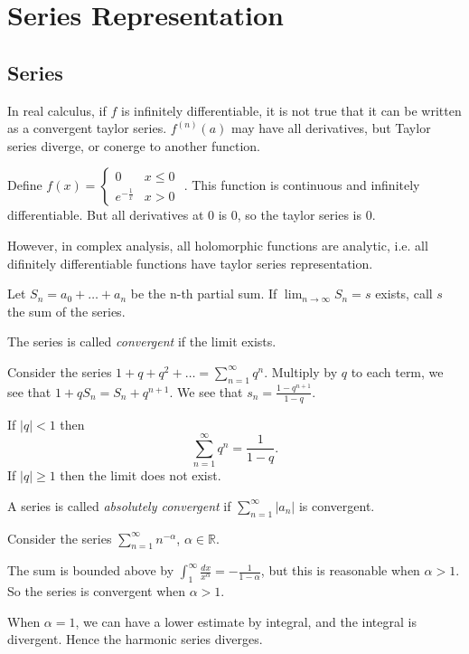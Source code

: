

\section{Series Representation}
\subsection{Series}

In real calculus, if $f$ is infinitely differentiable, it is not true that it can be written as a convergent taylor series. $f^{(n)}(a)$ may have all derivatives, but Taylor series diverge, or conerge to another function.
\begin{example}
	Define $f(x) = \begin{cases}
		0 & x\le 0\\
		e^{- \frac{1}{x}} & x>0
	\end{cases}$
	. This function is continuous and infinitely differentiable. But all derivatives at $0$ is $0$, so the taylor series is $0$.
\end{example}

However, in complex analysis, all holomorphic functions are analytic, i.e. all difinitely differentiable functions have taylor series representation.

\begin{definition}[Series]
	Let $S_n = a_0 + \ldots+ a_n$ be the n-th partial sum. If $\lim_{n \to \infty} S_n = s$ exists, call $s$ the sum of the series.

	The series is called \textit{convergent} if the limit exists.
\end{definition}

\begin{lemma}
	Consider the series $1 + q + q^2 + \ldots = \sum_{n=1}^{\infty} q^n$. Multiply by $q$ to each term, we see that $1 + qS_n = S_n + q^{n+1}$. We see that $s_n = \frac{1 - q^{n+1}}{1 - q}$.

	If $|q| < 1$ then
	\[
		\sum_{n=1}^{\infty} q^n = \frac{1}{1-q}
	.\]
	 If $|q| \ge 1$ then the limit does not exist.
\end{lemma}

\begin{definition}
	A series is called \textit{absolutely convergent} if $\sum_{n=1}^{\infty} |a_n|$ is convergent.
\end{definition}

\begin{example}
	Consider the series $\sum_{n=1}^{\infty} n^{- \alpha}$, $\alpha \in \mathbb{R}$.

The sum is bounded above by $\int_1^{\infty } \frac{dx }{x^\alpha}= - \frac{1}{1-\alpha}$, but this is reasonable when $\alpha > 1$. So the series is convergent when $\alpha>1$.

When $\alpha = 1$, we can have a lower estimate by integral, and the integral is divergent. Hence the harmonic series diverges.
\end{example}

